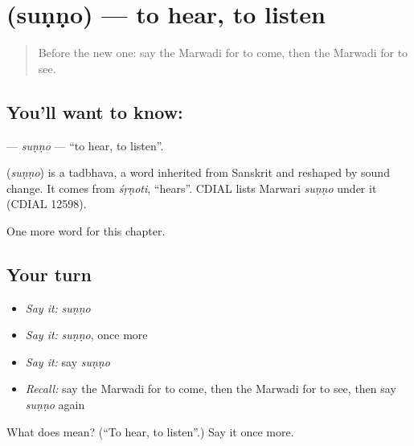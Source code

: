 \section[\texorpdfstring{\mw{सुणणो} (suṇṇo)}{सुणणो (suṇṇo)}]{ (suṇṇo) — to hear, to listen}

\label{lesson:MW-C51-sunno}



\begin{quote}
Before the new one: say the Marwadi for to come, then the Marwadi for to see.
\end{quote}

\subsection*{You'll want to know: }
\textbf{} — \emph{suṇṇo} — \textquotedblleft{}to hear, to listen\textquotedblright{}.

\begin{cousinweb}
\textbf{} (\emph{suṇṇo}) is a tadbhava, a word inherited from Sanskrit and reshaped by sound change. It comes from \emph{śṛṇoti}, \textquotedblleft{}hears\textquotedblright{}. CDIAL lists Marwari \emph{suṇṇo} under it (CDIAL 12598).
\end{cousinweb}

\begin{grammarlens}[title={What you've built}]
One more word for this chapter.
\end{grammarlens}

\subsection*{Your turn}
\begin{itemize}
\raggedright
  \item \emph{Say it:} \emph{suṇṇo}
  \item \emph{Say it:} \emph{suṇṇo}, once more
  \item \emph{Say it:} say \emph{suṇṇo}
  \item \emph{Recall:} say the Marwadi for to come, then the Marwadi for to see, then say \emph{suṇṇo} again
\end{itemize}

\begin{tcolorbox}[breakable,colback=teal!4,colframe=teal!35!black,title={Before you move on}]
What does  mean? (\textquotedblleft{}To hear, to listen\textquotedblright{}.) Say it once more.
\end{tcolorbox}
